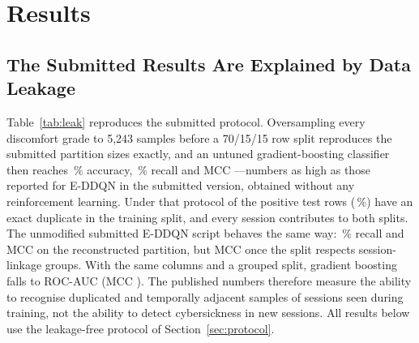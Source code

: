 \section{Results}
\label{sec:results}

\subsection{The Submitted Results Are Explained by Data Leakage}
\label{sec:leak}
Table~\ref{tab:leak} reproduces the submitted protocol. Oversampling every discomfort grade to 5,243 samples before a 70/15/15 row split reproduces the submitted partition sizes exactly, and an untuned gradient-boosting classifier then reaches \LeakOldAcc\,\% accuracy, \LeakOldRecall\,\% recall and MCC \LeakOldMCC{}---numbers as high as those reported for E-DDQN in the submitted version, obtained without any reinforcement learning. Under that protocol \LeakDupPos{} of the \LeakTestPos{} positive test rows (\LeakDupPct\,\%) have an exact duplicate in the training split, and every session contributes to both splits. The unmodified submitted E-DDQN script behaves the same way: \OrigOldRecall\,\% recall and MCC \OrigOldMCC{} on the reconstructed partition, but MCC \OrigGrpMCC{} once the split respects session-linkage groups. With the same columns and a grouped split, gradient boosting falls to ROC-AUC \LeakGrpRocAuc{} (MCC \LeakGrpMCC{}). The published numbers therefore measure the ability to recognise duplicated and temporally adjacent samples of sessions seen during training, not the ability to detect cybersickness in new sessions. All results below use the leakage-free protocol of Section~\ref{sec:protocol}.

\begin{table}[t]
\centering
\caption{Effect of the evaluation protocol on the same data (21 raw columns of the curated release). Test-split metrics; ``proxy'' marks the reconstruction of the submitted pipeline (its 41-feature files were not available).}
\label{tab:leak}
\resizebox{\textwidth}{!}{}
\end{table}

